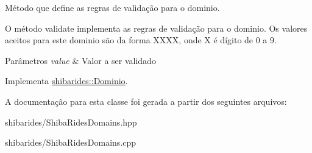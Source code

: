 Método que define as regras de validação para o dominio. 

O método validate implementa as regras de validação para o dominio. Os valores aceitos para este dominio são da forma X\+X\+XX, onde X é dígito de 0 a 9.


\begin{DoxyParams}{Parâmetros}
{\em value} & Valor a ser validado \\
\hline
\end{DoxyParams}


Implementa \hyperlink{classshibarides_1_1Dominio_acc9445531455c072bbf708709aebbe55}{shibarides\+::\+Dominio}.



A documentação para esta classe foi gerada a partir dos seguintes arquivos\+:\begin{DoxyCompactItemize}
\item 
shibarides/Shiba\+Rides\+Domains.\+hpp\item 
shibarides/Shiba\+Rides\+Domains.\+cpp\end{DoxyCompactItemize}
